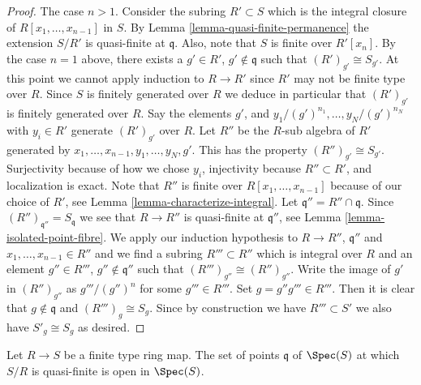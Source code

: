 \begin{proof}
\medskip\noindent
The case $n > 1$. Consider the subring $R' \subset S$
which is the integral closure of $R[x_1, \ldots, x_{n-1}]$
in $S$. By Lemma \ref{lemma-quasi-finite-permanence} the extension
$S/R'$ is quasi-finite at $\mathfrak q$. Also, note
that $S$ is finite over $R'[x_n]$.
By the case $n = 1$ above, there exists a $g' \in R'$,
$g' \not \in \mathfrak q$ such that
$(R')_{g'} \cong S_{g'}$. At this point we cannot
apply induction to $R \to R'$ since $R'$ may not be finite type over $R$.
Since $S$ is finitely generated over $R$ we deduce in particular
that $(R')_{g'}$ is finitely generated over $R$. Say
the elements $g'$, and $y_1/(g')^{n_1}, \ldots, y_N/(g')^{n_N}$
with $y_i \in R'$
generate $(R')_{g'}$ over $R$. Let $R''$ be the $R$-sub algebra
of $R'$ generated by $x_1, \ldots, x_{n-1}, y_1, \ldots, y_N, g'$.
This has the property $(R'')_{g'} \cong S_{g'}$. Surjectivity
because of how we chose $y_i$, injectivity because
$R'' \subset R'$, and localization is exact. Note that
$R''$ is finite over $R[x_1, \ldots, x_{n-1}]$ because
of our choice of $R'$, see Lemma \ref{lemma-characterize-integral}.
Let $\mathfrak q'' = R'' \cap \mathfrak q$. Since
$(R'')_{\mathfrak q''} = S_{\mathfrak q}$ we see that
$R \to R''$ is quasi-finite at $\mathfrak q''$, see
Lemma \ref{lemma-isolated-point-fibre}.
We apply our induction hypothesis to $R \to R''$, $\mathfrak q''$
and $x_1, \ldots, x_{n-1} \in R''$ and we find a subring
$R''' \subset R''$ which is integral over $R$ and an
element $g'' \in R'''$, $g'' \not \in \mathfrak q''$
such that $(R''')_{g''} \cong (R'')_{g''}$. Write the image of $g'$ in
$(R'')_{g''}$ as $g'''/(g'')^n$ for some $g''' \in  R'''$.
Set $g = g''g''' \in R'''$. Then it is clear that $g \not\in
\mathfrak q$ and $(R''')_g \cong S_g$. Since by construction
we have $R''' \subset S'$ we also have $S'_g \cong S_g$ as desired.
\end{proof}

\begin{lemma}
\label{lemma-quasi-finite-open}
Let $R \to S$ be a finite type ring map.
The set of points $\mathfrak q$ of $\Spec(S)$ at which
$S/R$ is quasi-finite is open in $\Spec(S)$.
\end{lemma}

